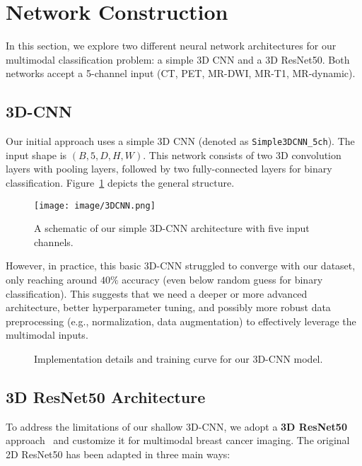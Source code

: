 \documentclass{article}
\begin{document}
\section{Network Construction}
In this section, we explore two different neural network architectures for our multimodal classification problem: a simple 3D CNN and a 3D ResNet50. Both networks accept a 5-channel input (CT, PET, MR-DWI, MR-T1, MR-dynamic).

\subsection{3D-CNN}
Our initial approach uses a simple 3D CNN (denoted as \texttt{Simple3DCNN\_5ch}). The input shape is \((B, 5, D, H, W)\). This network consists of two 3D convolution layers with pooling layers, followed by two fully-connected layers for binary classification. Figure~\ref{fig:3dcnn} depicts the general structure.

\begin{figure}[H]
\centering
\texttt{[image: image/3DCNN.png]}
\caption{A schematic of our simple 3D-CNN architecture with five input channels.}
\label{fig:3dcnn}
\end{figure}

However, in practice, this basic 3D-CNN struggled to converge with our dataset, only reaching around $40\%$ accuracy (even below random guess for binary classification). This suggests that we need a deeper or more advanced architecture, better hyperparameter tuning, and possibly more robust data preprocessing (e.g., normalization, data augmentation) to effectively leverage the multimodal inputs.

\begin{figure}[H]
    \centering
    \caption{Implementation details and training curve for our 3D-CNN model.}
\end{figure}

\subsection{3D ResNet50 Architecture}
To address the limitations of our shallow 3D-CNN, we adopt a \textbf{3D ResNet50} approach~\cite{ResNet} and customize it for multimodal breast cancer imaging. The original 2D ResNet50 has been adapted in three main ways:
\end{document}
